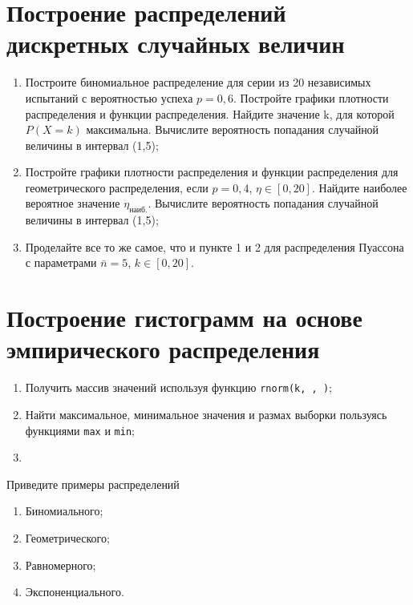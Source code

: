 \documentclass[14pt,a4paper]{article}
\begin{document}
\section{Построение распределений дискретных случайных величин}
\noindent\begin{enumerate}
	\item Построите биномиальное распределение для серии из 20 независимых испытаний с вероятностью успеха $p = 0,6$. Постройте графики плотности распределения и функции распределения. Найдите значение k, для которой $P(X=k)$ максимальна. Вычислите вероятность попадания случайной величины в интервал (1,5);
	\item Постройте графики плотности распределения и функции распределения для геометрического распределения, если $p=0,4$,  $\eta \in [0,20]$. Найдите наиболее вероятное значение $\eta_\text{наиб.}$. Вычислите вероятность попадания случайной величины в интервал (1,5);
	\item Проделайте все то же самое, что и пункте 1 и 2 для распределения Пуассона с параметрами $\bar{n}=5$, $k \in [0,20]$. 
\end{enumerate}


\section{Построение гистограмм на основе эмпирического распределения}
\noindent \begin{enumerate}
	\item Получить массив значений используя функцию \texttt{rnorm(k, \textmu, \textsigma)};
	\item Найти максимальное, минимальное значения и размах выборки пользуясь функциями \texttt{max} и \texttt{min};
	\item %
\end{enumerate}

\questions{}
Приведите примеры распределений
\begin{enumerate}
	\item Биномиального;
	\item Геометрического;
	\item Равномерного;
	\item Экспоненциального.
\end{enumerate}

\nocite{Plis2003, Krestlev2010,MathCADshortcuts,Ochkov2016}
\printbibliography[title={Рекомендуемая литература}]
\end{document}
